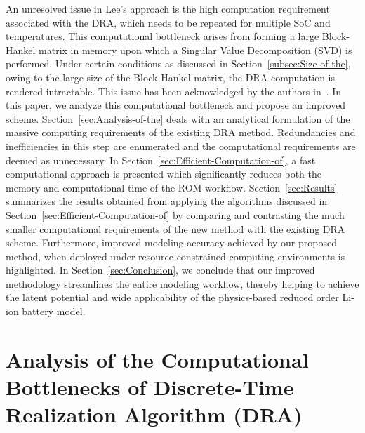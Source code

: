 An unresolved issue in Lee\textquoteright s approach is the high computation
requirement associated with the DRA, which needs to be repeated for
multiple SoC and temperatures. This computational bottleneck arises
from forming a large Block-Hankel matrix in memory upon which a Singular
Value Decomposition (SVD) is performed. Under certain conditions as
discussed in Section~\ref{subsec:Size-of-the}, owing to the large
size of the Block-Hankel matrix, the DRA computation is rendered intractable.
This issue has been acknowledged by the authors in~\citep{Lee2012,Plett2015}.
In this paper, we analyze this computational bottleneck and propose
an improved scheme. Section~\ref{sec:Analysis-of-the} deals with
an analytical formulation of the massive computing requirements of
the existing DRA method. Redundancies and inefficiencies in this step
are enumerated and the computational requirements are deemed as unnecessary.
In Section~\ref{sec:Efficient-Computation-of}, a fast computational
approach is presented which significantly reduces both the memory
and computational time of the ROM workflow. Section~\ref{sec:Results}
summarizes the results obtained from applying the algorithms discussed
in Section~\ref{sec:Efficient-Computation-of} by comparing and contrasting
the much smaller computational requirements of the new method with
the existing DRA scheme. Furthermore, improved modeling accuracy achieved
by our proposed method, when deployed under resource-constrained computing
environments is highlighted. In Section~\ref{sec:Conclusion}, we
conclude that our improved methodology streamlines the entire modeling
workflow, thereby helping to achieve the latent potential and wide
applicability of the physics-based reduced order Li-ion battery model.

\section{Analysis of the Computational Bottlenecks of Discrete-Time Realization
	Algorithm (DRA)\label{sec:Analysis-of-the}}


